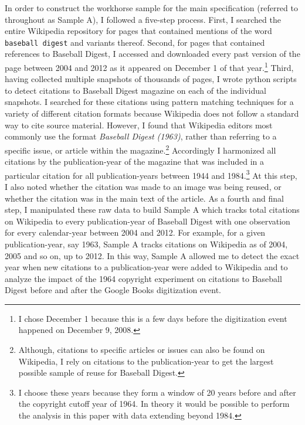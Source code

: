 \documentclass[11pt]{article}
\begin{document}
In order to construct the workhorse sample for the main specification (referred to throughout as Sample A), I followed a five-step process. First, I searched the entire Wikipedia repository for pages that contained mentions of the word \texttt{baseball digest} and variants thereof.  Second, for pages that contained references to Baseball Digest, I accessed and downloaded every past version of the page between 2004 and 2012 as it appeared on December 1 of that year.\footnote{I chose December 1 because this is a few days before the digitization event happened on December 9, 2008.} Third, having collected multiple snapshots of thousands of pages, I wrote python scripts to detect citations to Baseball Digest magazine on each of the individual snapshots. I searched for these citations using pattern matching techniques for a variety of different citation formats because Wikipedia does not follow a standard way to cite source material. However, I found that Wikipedia editors most commonly use the format \emph{Baseball Digest (1963)}, rather than referring to a specific issue, or article within the magazine.\footnote{Although, citations to specific articles or issues can also be found on Wikipedia, I rely on citations to the publication-year to get the largest possible sample of reuse for Baseball Digest.} Accordingly I harmonized all citations by the publication-year of the magazine that was included in a particular citation for all publication-years between 1944 and 1984.\footnote{I choose these years because they form a window of 20 years before and after the copyright cutoff year of 1964. In theory it would be possible to perform the analysis in this paper with data extending beyond 1984.} At this step, I also noted whether the citation was made to an image was being reused, or whether the citation was in the main text of the article. As a fourth and final step, I manipulated these raw data to build Sample A which tracks total citations on Wikipedia to every publication-year of Baseball Digest with one observation for every calendar-year between 2004 and 2012. For example, for a given publication-year, say 1963, Sample A tracks citations on Wikipedia as of 2004, 2005 and so on, up to 2012. In this way, Sample A allowed me to detect the exact year when new citations to a publication-year were added to Wikipedia and to analyze the impact of the 1964 copyright experiment on citations to Baseball Digest before and after the Google Books digitization event. 
\end{document}
